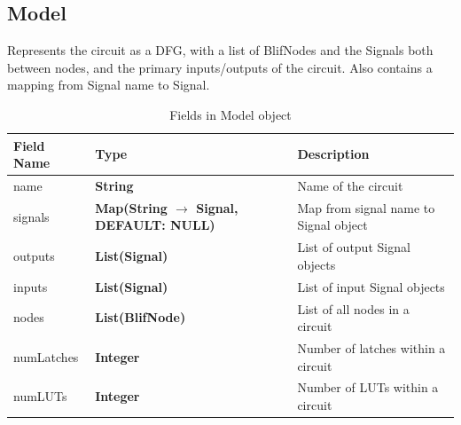 \documentclass[12pt,final,oneside]{dwThesis} %
\begin{document}
   \subsection{Model}
   Represents the circuit as a \gls{DFG}, with a list of
   BlifNodes and the Signals both between nodes, and the primary inputs/outputs
   of the circuit.  Also contains a mapping from Signal name to Signal.

   \begin{table}
      \begin{center}

      \begin{tabularx}
         {\linewidth}{lXX} \toprule Field Name & Type &
         Description\\
         \midrule name & \textbf{String} & Name of the circuit
         \\
         signals & \textbf{Map(String $\to$ Signal, DEFAULT: NULL)} & Map
         from signal name to Signal object \\
         outputs & \textbf{List(Signal)} &
         List of output Signal objects \\
         inputs & \textbf{List(Signal)} & List
         of input Signal objects \\
         nodes & \textbf{List(BlifNode)} & List of
         all nodes in a circuit \\
         numLatches & \textbf{Integer} & Number of
         latches within a circuit \\
         numLUTs & \textbf{Integer} & Number of
         LUTs within a circuit \\
         \bottomrule 
      \end{tabularx}
      \caption{Fields in
         Model object} 
   \end{center}\end{table}
\end{document}
